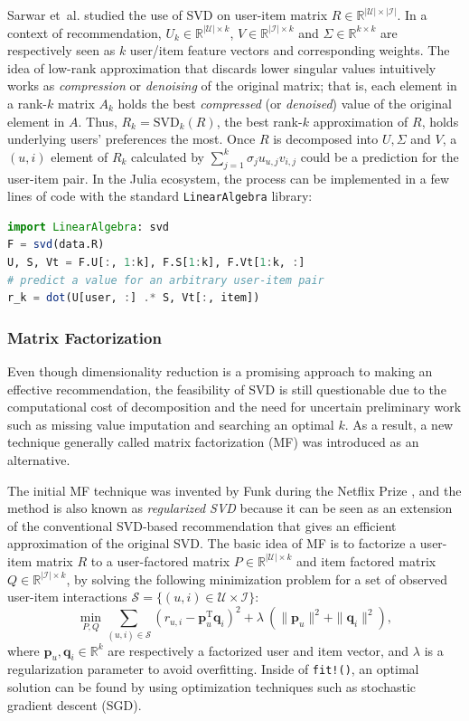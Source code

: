 Sarwar et~al. \cite{Sarwar2000} studied the use of SVD on user-item matrix $R \in \mathbb{R}^{|\mathcal{U}| \times |\mathcal{I}|}$. In a context of recommendation, $U_k \in \mathbb{R}^{|\mathcal{U}| \times k}$, $V \in \mathbb{R}^{|\mathcal{I}| \times k}$ and $\Sigma \in \mathbb{R}^{k \times k}$ are respectively seen as $k$ user/item feature vectors and corresponding weights. The idea of low-rank approximation that discards lower singular values intuitively works as \textit{compression} or \textit{denoising} of the original matrix; that is, each element in a rank-$k$ matrix $A_k$ holds the best \textit{compressed} (or \textit{denoised}) value of the original element in $A$. Thus, $R_k = \mathrm{SVD}_k(R)$, the best rank-$k$ approximation of $R$, holds underlying users' preferences the most. Once $R$ is decomposed into $U, \Sigma$ and $V$, a $(u, i)$ element of $R_k$ calculated by $\sum^k_{j=1} \sigma_j u_{u, j} v_{i, j}$ could be a prediction for the user-item pair. In the Julia ecosystem, the process can be implemented in a few lines of code with the standard \texttt{LinearAlgebra} library:

\begin{lstlisting}[language = Julia]
import LinearAlgebra: svd
F = svd(data.R)
U, S, Vt = F.U[:, 1:k], F.S[1:k], F.Vt[1:k, :]
# predict a value for an arbitrary user-item pair
r_k = dot(U[user, :] .* S, Vt[:, item])
\end{lstlisting}

\subsubsection{Matrix Factorization}

Even though dimensionality reduction is a promising approach to making an effective recommendation, the feasibility of SVD is still questionable due to the computational cost of decomposition and the need for uncertain preliminary work such as missing value imputation and searching an optimal $k$. As a result, a new technique generally called matrix factorization (MF) was introduced \cite{Koren2009} as an alternative.

The initial MF technique was invented by Funk \cite{Funk2006} during the Netflix Prize \cite{Bennett07thenetflix}, and the method is also known as \textit{regularized SVD} because it can be seen as an extension of the conventional SVD-based recommendation that gives an efficient approximation of the original SVD. The basic idea of MF is to factorize a user-item matrix $R$ to a user-factored matrix $P \in \mathbb{R}^{|\mathcal{U}| \times k}$ and item factored matrix $Q \in \mathbb{R}^{|\mathcal{I}| \times k}$, by solving the following minimization problem for a set of observed user-item interactions $\mathcal{S} = \{(u, i) \in \mathcal{U} \times \mathcal{I}\}$:
$$
  \min_{P, Q} \sum_{(u, i) \in \mathcal{S}} \left( r_{u,i} - \mathbf{p}_u^{\mathrm{T}} \mathbf{q}_i \right)^2 + \lambda \ (\|\mathbf{p}_u\|^2 + \|\mathbf{q}_i\|^2),
$$
where $\mathbf{p}_u, \mathbf{q}_i \in \mathbb{R}^k$ are respectively a factorized user and item vector, and $\lambda$ is a regularization parameter to avoid overfitting. Inside of \texttt{fit!()}, an optimal solution can be found by using optimization techniques such as stochastic gradient descent (SGD).


